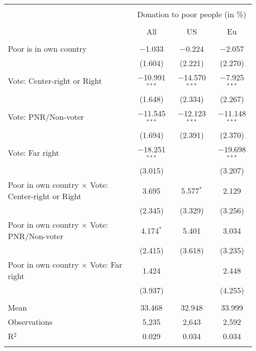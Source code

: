 
\begin{tabular}{@{\extracolsep{5pt}}lccc} 
\\[-1.8ex]\hline 
\hline \\[-1.8ex] 
 & \multicolumn{3}{c}{Donation to poor people (in \%)} \\ 
\cline{2-4} 
\\[-1.8ex] & All & US & Eu \\ 
\hline \\[-1.8ex] 
 Poor is in own country & $-$1.033 & $-$0.224 & $-$2.057 \\ 
  & (1.604) & (2.221) & (2.270) \\ 
  Vote: Center-right or Right & $-$10.991$^{***}$ & $-$14.570$^{***}$ & $-$7.925$^{***}$ \\ 
  & (1.648) & (2.334) & (2.267) \\ 
  Vote: PNR/Non-voter & $-$11.545$^{***}$ & $-$12.123$^{***}$ & $-$11.148$^{***}$ \\ 
  & (1.694) & (2.391) & (2.370) \\ 
  Vote: Far right & $-$18.251$^{***}$ &  & $-$19.698$^{***}$ \\ 
  & (3.015) &  & (3.207) \\ 
  Poor in own country $\times$ Vote: Center-right or Right & 3.695 & 5.577$^{*}$ & 2.129 \\ 
  & (2.345) & (3.329) & (3.256) \\ 
  Poor in own country $\times$ Vote: PNR/Non-voter & 4.174$^{*}$ & 5.401 & 3.034 \\ 
  & (2.415) & (3.618) & (3.235) \\ 
  Poor in own country $\times$ Vote: Far right & 1.424 &  & 2.448 \\ 
  & (3.937) &  & (4.255) \\ 
 \hline \\[-1.8ex] 
Mean & 33.468 & 32.948 & 33.999 \\ 
Observations & 5,235 & 2,643 & 2,592 \\ 
R$^{2}$ & 0.029 & 0.034 & 0.034 \\ 
\hline 
\hline \\[-1.8ex] 
\end{tabular} 